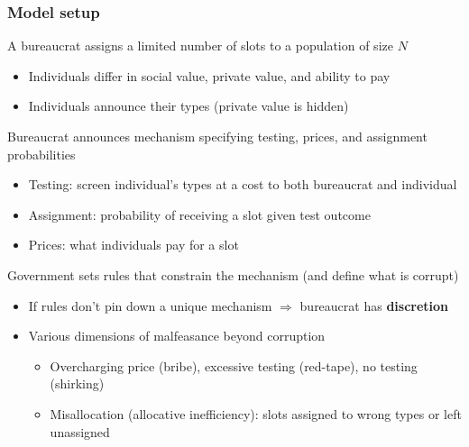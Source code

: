 \documentclass[aspectratio=169]{beamer}
\begin{document}
\begin{frame}
\frametitle{Model setup}
A bureaucrat assigns a limited number of slots to a population of size $N$
\begin{itemize}\setlength\itemsep{3pt}
\item Individuals differ in social value, private value, and ability to pay
\item Individuals announce their types (private value is hidden)
\end{itemize}\medskip
Bureaucrat announces mechanism specifying testing, prices, and assignment probabilities
\begin{itemize}\setlength\itemsep{3pt}
\item Testing: screen individual's types at a cost to both bureaucrat and individual
\item Assignment: probability of receiving a slot given test outcome
\item Prices: what individuals pay for a slot
\end{itemize}\medskip
Government sets rules that constrain the mechanism (and define what is corrupt)
\begin{itemize}\setlength\itemsep{3pt}
\item If rules don't pin down a unique mechanism $\Rightarrow$ bureaucrat has \textbf{discretion}
\item Various dimensions of malfeasance beyond corruption
\begin{itemize}\setlength\itemsep{3pt}
  \item Overcharging price (bribe), excessive testing (red-tape), no testing (shirking)
  \item Misallocation (allocative inefficiency): slots assigned to wrong types or left unassigned
\end{itemize}
\end{itemize}
\end{frame}
\end{document}

